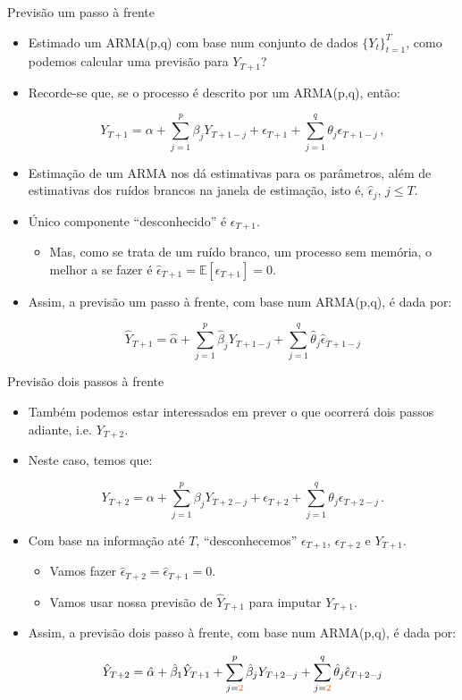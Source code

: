 \documentclass[11pt]{beamer}
\begin{document}
\begin{frame}{Previsão um passo à frente}
	\begin{itemize}
		\item Estimado um ARMA(p,q) com base num conjunto de dados $\{Y_t\}_{t=1}^T$, como podemos calcular uma previsão para $Y_{T+1}$?
		\item Recorde-se que, se o processo é descrito por um ARMA(p,q), então:
		
		$$Y_{T+1} = \alpha + \sum_{j=1}^{p} \beta_j Y_{T+1-j} + \epsilon_{T+1} + \sum_{j=1}^q \theta_j \epsilon_{T+1-j} \, ,  $$
		
		\item Estimação de um ARMA nos dá estimativas para os parâmetros, além de estimativas dos ruídos brancos na janela de estimação, isto é, $\hat \epsilon_{j}$, $j \leq T$.
		\item Único componente ``desconhecido'' é $\epsilon_{T+1}$.
		\begin{itemize}
				\item Mas, como se trata de um ruído branco, um processo sem memória, o melhor a se fazer é $\hat \epsilon_{T+1} = \mathbb{E}[\epsilon_{T+1}] = 0$.
		\end{itemize}
		\item Assim, {\color{blue}a previsão um passo à frente}, com base num ARMA(p,q), é dada por:
		
		$$\hat Y_{T+1} = \hat \alpha + \sum_{j=1}^p \hat{\beta}_j Y_{T+1-j} + \sum_{j=1}^q \hat \theta_j \hat \epsilon_{T+1-j}$$
	
	\end{itemize}
\end{frame}

\begin{frame}{Previsão dois passos à frente}
	\begin{itemize}
		\item Também podemos estar interessados em prever o que ocorrerá dois passos adiante, i.e. $Y_{T+2}$.
		\item Neste caso, temos que:
		
		$$Y_{T+2} = \alpha + \sum_{j=1}^p \beta_{j} 	Y_{T+2-j} + \epsilon_{T+2} + \sum_{j=1}^q \theta_j \epsilon_{T+2-j}\, .$$
		
		\item Com base na informação até $T$, ``desconhecemos'' $\epsilon_{T+1}$, $\epsilon_{T+2}$ e $Y_{T+1}$.
		\begin{itemize}
			\item Vamos fazer $\hat \epsilon_{T+2} = \hat \epsilon_{T+1} = 0$.
			\item Vamos usar nossa previsão de $\hat{Y}_{T+1}$ para imputar $Y_{T+1}$.
		\end{itemize}
			\item Assim, {\color{blue}a previsão dois passo à frente}, com base num ARMA(p,q), é dada por:
		
		$$\hat Y_{T+2} = \hat \alpha + \hat \beta_1 \hat Y_{T+1} + \sum_{j={\color{red}2}}^p \hat{\beta}_j Y_{T+2-j} + \sum_{j={\color{red}2}}^q \hat \theta_j \hat\epsilon_{T+2-j}$$
	\end{itemize}
\end{frame}
\end{document}
